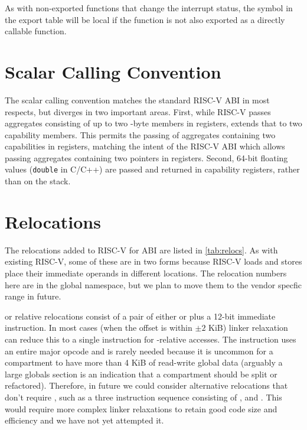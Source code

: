 As with non-exported functions that change the interrupt status, the symbol in the export table will be local if the function is not also exported as a directly callable function.

\section{Scalar Calling Convention}

The \cherimcu{} scalar calling convention matches the standard RISC-V ABI in most respects, but diverges in two important areas.
First, while RISC-V passes aggregates consisting of up to two \xlen-byte members in registers, \cherimcu{} extends that to two capability members.
This permits the passing of aggregates containing two capabilities in registers, matching the intent of the RISC-V ABI which allows passing aggregates containing two pointers in registers.
Second, 64-bit floating values (\texttt{double} in C/C++) are passed and returned in capability registers, rather than on the stack.

\section{Relocations}
\label{sec:relocs}

The relocations added to RISC-V for \cherimcu{} ABI are listed in \cref{tab:relocs}.
As with existing RISC-V, some of these are in two forms because RISC-V loads and stores place their immediate operands in different locations.
The relocation numbers here are in the global namespace, but we plan to move them to the vendor specfic range in future.

\PCC{} or \CGP{} relative relocations consist of a pair of either  or  plus a 12-bit immediate instruction.
In most cases (when the offset is within $\pm2$ KiB) linker relaxation can reduce this to a single instruction for \CGP-relative accesses.
The  instruction uses an entire major opcode and is rarely needed because it is uncommon for a compartment to have more than 4 KiB of read-write global data (arguably a large globals section is an indication that a compartment should be split or refactored).
Therefore, in future we could consider alternative relocations that don't require , such as a three instruction sequence consisting of ,  and .
This would require more complex linker relaxations to retain good code size and efficiency and we have not yet attempted it.

